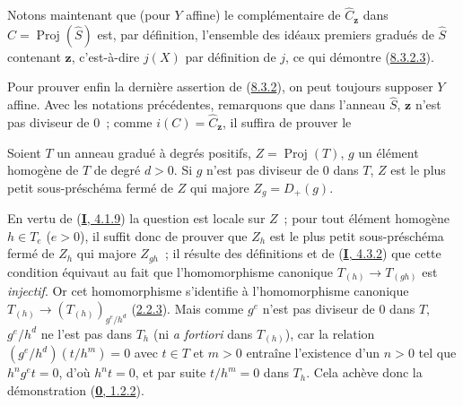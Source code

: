 Notons maintenant que (pour $Y$ affine) le complémentaire de
$\widehat{C}_{\mathbf{z}}$ dans $\widehat{C}=\operatorname{Proj}(\widehat{S})$
est, par définition, l'ensemble des idéaux premiers gradués de $\widehat{S}$
contenant $\mathbf{z}$, c'est-à-dire $j(X)$ par définition de $j$, ce qui démontre
(\hyperref[II.8.3.2.3-fr]{8.3.2.3}).

Pour prouver enfin la dernière assertion de
(\hyperref[II.8.3.2-fr]{8.3.2}), on peut toujours supposer $Y$ affine. Avec
les notations précédentes, remarquons que dans l'anneau $\widehat{S}$, $\mathbf{z}$
n'est pas diviseur de $0$~; comme $i(C)=\widehat{C}_{\mathbf{z}}$, il suffira
de prouver le

\begin{lemma}[8.3.2.7]
\label{II.8.3.2.7-fr}
Soient $T$ un anneau gradué à degrés positifs,
$Z=\operatorname{Proj}(T)$, $g$ un élément homogène de $T$ de degré $d>0$.
Si $g$ n'est pas diviseur de $0$ dans $T$, $Z$ est le plus petit
sous-préschéma fermé de $Z$ qui majore $Z_g=D_+(g)$.
\end{lemma}

En vertu de (\hyperref[I.4.1.9-fr]{\textbf{I}, 4.1.9}) la question est locale sur $Z$~;
pour tout élément homogène $h\in T_e$ ($e>0$), il suffit donc de prouver que
$Z_h$ est le plus petit sous-préschéma fermé de $Z_h$ qui majore $Z_{gh}$~;
il résulte des définitions et de (\hyperref[I.4.3.2-fr]{\textbf{I}, 4.3.2}) que cette
condition équivaut au fait que l'homomorphisme canonique
$T_{(h)}\to T_{(gh)}$ est \emph{injectif}. Or cet homomorphisme s'identifie à
l'homomorphisme canonique
$T_{(h)}\to(T_{(h)})_{g^e/h^d}$ (\hyperref[II.2.2.3-fr]{2.2.3}). Mais comme
$g^e$ n'est pas diviseur de $0$ dans $T$, $g^e/h^d$ ne l'est pas dans $T_h$
(ni \emph{a fortiori} dans $T_{(h)}$), car la relation
$(g^e/h^d)(t/h^m)=0$ avec $t\in T$ et $m>0$ entraîne l'existence d'un $n>0$
tel que $h^ng^et=0$, d'où $h^nt=0$, et par suite $t/h^m=0$ dans $T_h$. Cela
achève donc la démonstration (\hyperref[0.1.2.2-fr]{\textbf{0}, 1.2.2}).


